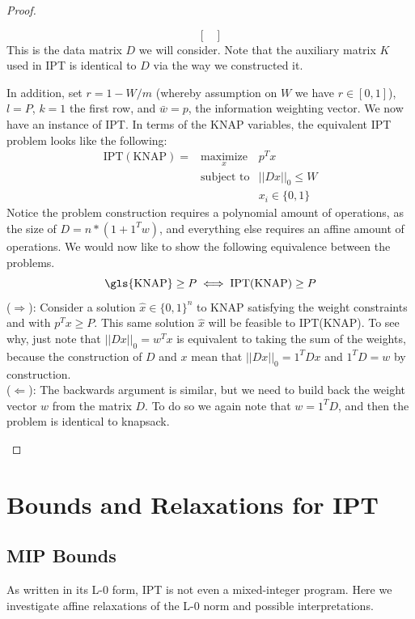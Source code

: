 \documentclass[12pt]{article}
\newcommand{\priv}{\text{IPT}}
\begin{document}
\begin{proof}
\begin{enumerate}
\begin{enumerate}
\[\begin{bmatrix}
            \end{bmatrix}\]
            This is the data matrix $D$ we will consider. Note that the auxiliary matrix $K$ used in \gls{IPT} is identical to $D$ via the way we constructed it.
        \end{enumerate}
        In addition, set $r = 1 - W/m$ (whereby assumption on $W$ we have $r \in [0,1]$), $l = P$, $k = 1$ the first row, and $\bar{w} = p$, the information weighting vector. We now have an instance of \gls{IPT}. In terms of the \gls{KNAP} variables, the equivalent \gls{IPT} problem looks like the following:
        \begin{equation}
            \begin{array}{lll}
                \priv(\text{KNAP}) = & \underset{x}{\text{maximize}} & p^T x \\
                & \mbox{subject to} & ||D x||_{0}  \leq W \\
                && x_i \in \{0,1\}
                \end{array}
        \end{equation}
        Notice the problem construction requires a polynomial amount of operations, as the size of $D = n * (1+ 1^T w)$, and everything else requires an affine amount of operations.
        We would now like to show the following equivalence between the problems. 
        \[\text{\gls{KNAP}} \geq P \iff \text{IPT(KNAP)} \geq P\]
       (\underline{$\Longrightarrow$}): Consider a solution $\hat{x}\in \{0,1\}^n$ to \gls{KNAP} satisfying the weight constraints and with $p^Tx \geq P$. This same solution $\hat{x}$ will be feasible to IPT(KNAP). To see why, just note that $||Dx||_0 = w^Tx$ is equivalent to taking the sum of the weights, because the construction of $D$ and $x$ mean that $||Dx||_0 = 1^TDx$ and $1^TD = w$ by construction. \\
       (\underline{$\Longleftarrow$}): The backwards argument is similar, but we need to build back the weight vector $w$ from the matrix $D$. To do so we again note that $w = 1^TD$, and then the problem is identical to knapsack.
    \end{enumerate}
\end{proof}


\section{Bounds and Relaxations for \gls{IPT}}
\subsection{\gls{MIP} Bounds}
As written in its L-0 form, \gls{IPT} is not even a mixed-integer program. Here we investigate affine relaxations of the L-0 norm and possible interpretations.
\end{document}
